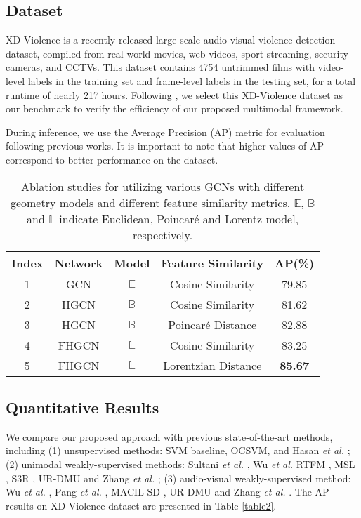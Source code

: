 \documentclass[sigconf]{acmart}
\newcommand{\etal}{{\emph{et al. }}}
\newcommand{\poincare}{Poincar\'e }
\begin{document}
\subsection{Dataset}
XD-Violence\cite{c:2} is a recently released large-scale audio-visual violence detection dataset, compiled from real-world movies, web videos, sport streaming, security cameras, and CCTVs. This dataset contains 4754 untrimmed films with video-level labels in the training set and frame-level labels in the testing set, for a total runtime of nearly 217 hours. Following \cite{c:2, pang2021violence, c:4}, we select this XD-Violence dataset as our benchmark to verify the efficiency of our proposed multimodal framework.

During inference, we use the Average Precision (AP) metric for evaluation following previous works\cite{c:1,c:2, pang2021violence,c:4}. It is important to note that higher values of AP correspond to better performance on the dataset.



\begin{table}[t]
  \caption{Ablation studies for utilizing various GCNs with different geometry models and different feature similarity metrics. $\mathbb{E}$, $\mathbb{B}$ and $\mathbb{L}$ indicate Euclidean, \poincare and Lorentz model, respectively.}
  \label{table3}
  \begin{tabular}{ccccc}
    \toprule
    Index  & Network & Model & Feature Similarity & AP(\%)\\
    \midrule
    1 &  GCN & $\mathbb{E}$ & Cosine Similarity & 79.85\\
    2 & HGCN & $\mathbb{B}$ & Cosine Similarity & 81.62\\
    3 & HGCN & $\mathbb{B}$ & \poincare Distance & 82.88 \\ \hline
    4  &  FHGCN & $\mathbb{L}$ & Cosine Similarity & 83.25\\
    5 & FHGCN & $\mathbb{L}$ & Lorentzian Distance & \textbf{85.67}\\
  \bottomrule
\end{tabular}
\end{table}



\subsection{Quantitative Results}
We compare our proposed approach with previous state-of-the-art methods, including (1) unsupervised methods: SVM baseline, OCSVM\cite{c:5}, and Hasan \etal\cite{c:6}; (2) unimodal weakly-supervised methods: Sultani \etal \cite{c:7}, Wu \etal \cite{c:8} RTFM \cite{c:1},  MSL \cite{c:9}, S3R \cite{c:11}, UR-DMU \cite{c:10} and Zhang \etal\cite{zhang2022exploiting}; (3) audio-visual weakly-supervised method: Wu \etal \cite{c:2},  Pang \etal \cite{pang2021violence}, MACIL-SD \cite{c:4}, UR-DMU \cite{c:10} and Zhang \etal\cite{zhang2022exploiting}. The AP results on XD-Violence dataset are presented in Table \ref{table2}. 
\end{document}
